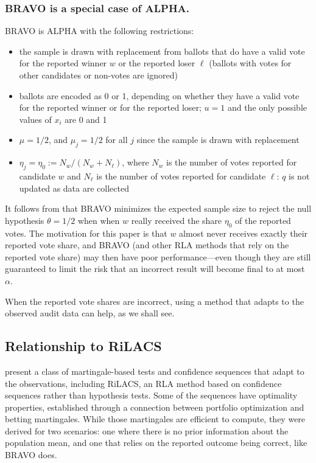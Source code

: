 \documentclass[12pt,runningheads]{llncs}
\begin{document}
{\subsubsection{BRAVO is a special case of ALPHA.}
BRAVO is ALPHA with the following restrictions:
\begin{itemize}
    \item the sample is drawn with replacement from ballots that do have a valid vote for the reported winner 
    $w$ or the reported loser $\ell$ (ballots with votes for other candidates or non-votes are ignored)
    \item  ballots are encoded as 0 or 1, depending on whether they have a valid vote
    for the reported winner or for the reported loser;  $u=1$ and the only possible values of $x_i$ are 0 and 1
    \item $\mu = 1/2$, and $\mu_j = 1/2$ for all $j$ since the sample is drawn with replacement
    \item  $\eta_j = \eta_0 := N_w/(N_w+N_\ell)$, where $N_w$ is the number of votes reported for candidate $w$ 
and $N_\ell$ is the number of votes reported for candidate $\ell$: $q$ is not updated as data are collected
\end{itemize}
It follows from \cite{wald45} that BRAVO minimizes the expected 
sample size to reject the null hypothesis $\theta=1/2$ when when $w$ really received
the share $\eta_0$ of the reported votes.
The motivation for this paper is that $w$ almost never receives exactly their reported vote share, and
BRAVO (and other RLA methods that rely on the reported vote share) may then have poor performance---even
though they are still guaranteed to limit the risk that an incorrect result will become final to at most $\alpha$.

When the reported vote shares are incorrect, using a method that
adapts to the observed audit data can help, as we shall see.

\subsection{Relationship to RiLACS} \label{sec:rilacs}
\cite{waudby-smithRamdas21,waudby-smithEtal21} present a class of martingale-based tests and
confidence sequences that adapt to the observations, including RiLACS, an RLA method based on confidence 
sequences rather than hypothesis tests. 
Some of the sequences have optimality properties, established through a connection between
portfolio optimization and betting martingales.
While those martingales are efficient to compute, they were derived for two scenarios: one where there is no
prior information about the population mean, and one that relies on the reported outcome being correct,
like BRAVO does. 

}
\end{document}
